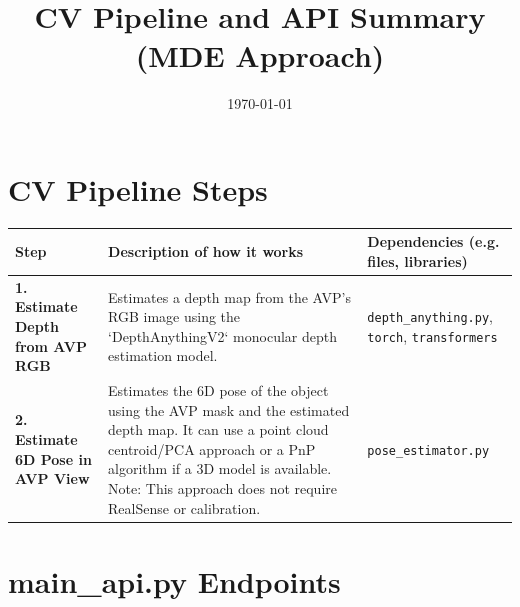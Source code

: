 \documentclass{article}
\title{CV Pipeline and API Summary (MDE Approach)}
\author{}
\date{\today}
\begin{document}
\maketitle

\section*{CV Pipeline Steps}

\begin{longtable}{| >{\raggedright\arraybackslash}p{} | >{\raggedright\arraybackslash}p{} | >{\raggedright\arraybackslash}p{} |}
\hline
\textbf{Step} & \textbf{Description of how it works} & \textbf{Dependencies (e.g. files, libraries)} \\
\hline
\endhead

\textbf{1. Estimate Depth from AVP RGB} & Estimates a depth map from the AVP's RGB image using the `DepthAnythingV2` monocular depth estimation model. & \texttt{depth\_anything.py}, \texttt{torch}, \texttt{transformers} \\
\hline
\textbf{2. Estimate 6D Pose in AVP View} & Estimates the 6D pose of the object using the AVP mask and the estimated depth map. It can use a point cloud centroid/PCA approach or a PnP algorithm if a 3D model is available. Note: This approach does not require RealSense or calibration. & \texttt{pose\_estimator.py} \\
\hline
\end{longtable}

\section*{main\_api.py Endpoints}
\end{document}
